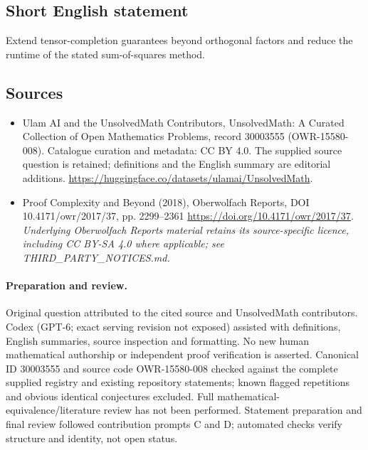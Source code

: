 \documentclass[11pt]{article}
\begin{document}
\subsection{Short English statement}
Extend tensor-completion guarantees beyond orthogonal factors and reduce the runtime of the stated sum-of-squares method.
\subsection{Sources}
\begin{itemize}
\item[\hypertarget{source:30003555:1}{S1}] Ulam AI and the UnsolvedMath Contributors, UnsolvedMath: A Curated Collection of Open Mathematics Problems, record 30003555 (OWR-15580-008). Catalogue curation and metadata: CC BY 4.0. The supplied source question is retained; definitions and the English summary are editorial additions.
\url{https://huggingface.co/datasets/ulamai/UnsolvedMath}.
\item[\hypertarget{source:30003555:2}{S2}] Proof Complexity and Beyond (2018), Oberwolfach Reports, DOI 10.4171/owr/2017/37, pp. 2299--2361
\url{https://doi.org/10.4171/owr/2017/37}.
\textit{Underlying Oberwolfach Reports material retains its source-specific licence, including CC BY-SA 4.0 where applicable; see THIRD\_PARTY\_NOTICES.md.}
\end{itemize}
\paragraph{Preparation and review.}
Original question attributed to the cited source and UnsolvedMath contributors. Codex (GPT-6; exact serving revision not exposed) assisted with definitions, English summaries, source inspection and formatting. No new human mathematical authorship or independent proof verification is asserted. Canonical ID 30003555 and source code OWR-15580-008 checked against the complete supplied registry and existing repository statements; known flagged repetitions and obvious identical conjectures excluded. Full mathematical-equivalence/literature review has not been performed. Statement preparation and final review followed contribution prompts C and D; automated checks verify structure and identity, not open status.
\label{end:30003555}
\end{document}
